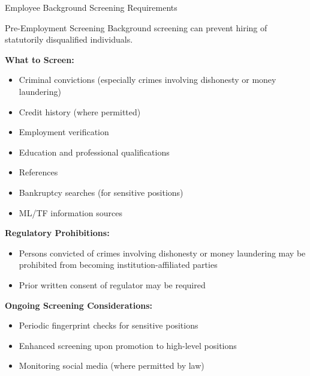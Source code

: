 \documentclass[11pt,a4paper]{beamer}
\begin{document}
	\begin{frame}{Employee Background Screening Requirements}
		\begin{block}{Pre-Employment Screening}
			Background screening can prevent hiring of statutorily disqualified individuals.
		\end{block}
		\textbf{What to Screen:}
		\begin{itemize}
			\item Criminal convictions (especially crimes involving dishonesty or money laundering)
			\item Credit history (where permitted)
			\item Employment verification
			\item Education and professional qualifications
			\item References
			\item Bankruptcy searches (for sensitive positions)
			\item ML/TF information sources
		\end{itemize}
		\textbf{Regulatory Prohibitions:}
		\begin{itemize}
			\item Persons convicted of crimes involving dishonesty or money laundering may be prohibited from becoming institution-affiliated parties
			\item Prior written consent of regulator may be required
		\end{itemize}
		\textbf{Ongoing Screening Considerations:}
		\begin{itemize}
			\item Periodic fingerprint checks for sensitive positions
			\item Enhanced screening upon promotion to high-level positions
			\item Monitoring social media (where permitted by law)
		\end{itemize}
	\end{frame}
	
\end{document}
